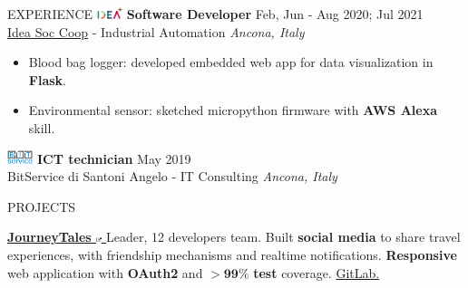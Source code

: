 \documentclass{cv} %
\def\intraexpvspace{0.15cm}
\begin{document}
\begin{minipage}[b][0.9\paperheight][t]{0.7\linewidth}
\begin{rSection}{EXPERIENCE}
        \includegraphics[width=0.75cm, trim={0cm 1.5cm 0cm 0cm}]{idea-icon.png}
        \textbf{Software Developer} \hfill Feb, Jun - Aug 2020; Jul 2021\\
        \hspace*{0.85cm}\href{https://idea-on-line.it/}{Idea Soc Coop} - Industrial Automation
        \hfill \textit{Ancona, Italy}
        \begin{itemize}
            \item Blood bag logger:
                  developed embedded web app for data visualization in \textbf{Flask}.

            \item Environmental sensor:
                  sketched micropython firmware with \textbf{AWS Alexa} skill.
        \end{itemize}
        \vspace{\intraexpvspace}
        \vspace{\intraexpvspace}

        \includegraphics[width=0.75cm, trim={0cm 1.5cm 0cm 0cm}]{bitservice-icon.png}
        \textbf{ICT technician} \hfill May 2019 \\
        \hspace*{0.85cm}BitService di Santoni Angelo - IT Consulting
        \hfill \textit{Ancona, Italy}
    \end{rSection}

    \begin{rSection}{PROJECTS}
        \item \textbf{\href{https://gitlab.com/usi-si-oss/teaching/projects-showcase/sa4/team-4-pufferfish} %
            {
                JourneyTales
                \includegraphics[width=0.15cm, trim={10cm -10cm 0cm 0cm}]{ext-link-icon.png}
            }}
        {Leader, 12 developers team.
            Built \textbf{social media} to share travel experiences,
            with friendship mechanisms and realtime notifications.
            \textbf{Responsive} web application with \textbf{OAuth2} and $\boldsymbol{> 99\%}$ \textbf{test} coverage.
            \href{https://gitlab.com/usi-si-oss/teaching/projects-showcase/sa4/team-4-pufferfish}{GitLab.}
        }


\end{rSection}
\end{minipage}
\end{document}
